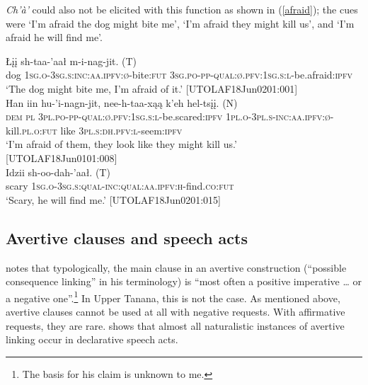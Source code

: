 \documentclass[output=paper,colorlinks,citecolor=brown]{langscibook}
\begin{document}
\textit{Ch'à'} could also not be elicited with this function as shown in (\ref{afraid}); the cues were `I'm afraid the dog might bite me', `I'm afraid they might kill us', and `I'm afraid he will find me'. 

\begin{exe}
\ex\label{afraid}
\begin{xlista}
\ex
\gll Łįį sh-taa-'aał {m-i-nag-jit. \textnormal{(T)}} \\
dog \textsc{1sg.o-3sg.s:inc:aa.ipfv:ø}-bite:\textsc{fut} \textsc{3sg.po-pp-qual:ø.pfv:1sg.s:l}-be.afraid:\textsc{ipfv} \\
\glt `The dog might bite me, I'm afraid of it.' \hfill [UTOLAF18Jun0201:001]\\
\ex 
\gll Han iin hu-'i-nagn-jit, nee-h-taa-xąą k'eh {hel-tsįį. \textnormal{(N)}}\\
\textsc{dem} \textsc{pl} \textsc{3pl.po-pp-qual:ø.pfv:1sg.s:l}-be.scared:\textsc{ipfv} \textsc{1pl.o-3pl.s-inc:aa.ipfv:ø}-kill.\textsc{pl.o:fut} like \textsc{3pl.s:dh.pfv:l}-seem:\textsc{ipfv}\\
\glt `I'm afraid of them, they look like they might kill us.' \\ \hfill [UTOLAF18Jun0101:008]\\
\ex
\gll Idzii {sh-oo-dah-'aał. \textnormal{(T)}} \\
scary \textsc{1sg.o-3sg.s:qual-inc:qual:aa.ipfv:h}-find.\textsc{co:fut} \\
\glt `Scary, he will find me.' \hfill [UTOLAF18Jun0201:015]\\
\end{xlista}
\end{exe}


\subsection{Avertive clauses and speech acts}
\label{subsubsection:avertive-speech}

\citet[24]{DixonRMW2009} notes that typologically, the main clause in an avertive construction (``possible consequence linking'' in his terminology) is ``most often a positive imperative  {\ldots} or a negative one''.\footnote{The basis for his claim is unknown to me.} In Upper Tanana, this is not the case. As mentioned above, avertive clauses cannot be used at all with negative requests. With affirmative requests, they are rare.  shows that almost all naturalistic instances of avertive linking occur in declarative speech acts.
\end{document}
